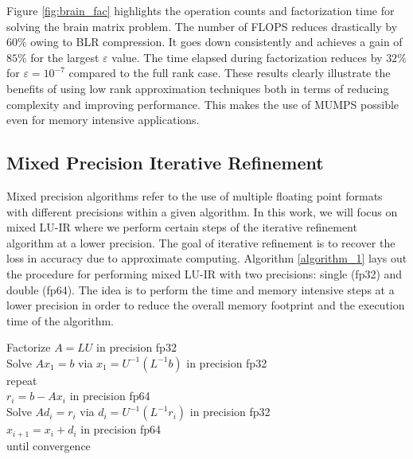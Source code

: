 \documentclass[a4paper,12pt]{article}
\begin{document}
Figure \ref{fig:brain_fac} highlights the operation counts and factorization time for solving the brain matrix problem. The number of FLOPS reduces drastically by $60\%$ owing to BLR compression. It goes down consistently and achieves a gain of $85\%$ for the largest $\varepsilon$ value. The time elapsed during factorization reduces by $32\%$ for $\varepsilon=10^{-7}$ compared to the full rank case. These results clearly illustrate the benefits of using low rank approximation techniques both in terms of reducing complexity and improving performance. This makes the use of MUMPS possible even for memory intensive applications.

\subsection{Mixed Precision Iterative Refinement}
Mixed precision algorithms refer to the use of multiple floating point formats with different precisions within a given algorithm. In this work, we will focus on mixed LU-IR where we perform certain steps of the iterative refinement algorithm at a lower precision. The goal of iterative refinement is to recover the loss in accuracy due to approximate computing. Algorithm \ref{algorithm_1} lays out the procedure for performing mixed LU-IR with two precisions: single (fp32) and double (fp64). The idea is to perform the time and memory intensive steps at a lower precision in order to reduce the overall memory footprint and the execution time of the algorithm.
\begin{algorithm}
    \caption{Mixed LU-IR}
    \label{algorithm_1}
    \begin{algorithmic}[1]
        \STATE Factorize $A=LU$ \hfill in precision fp32\\
        \STATE Solve $Ax_1=b$ via $x_1=U^{-1}(L^{-1}b)$ \hfill in precision fp32\\
        \STATE repeat \\
        \STATE \quad $r_i = b - Ax_i$ \hfill in precision fp64\\
        \STATE \quad Solve $Ad_i=r_i$ via $d_i=U^{-1}(L^{-1}r_i)$ \hfill in precision fp32\\
        \STATE \quad $x_{i+1} = x_i + d_i$ \hfill in precision fp64\\
        \STATE until convergence \\
    \end{algorithmic}
\end{algorithm}
\end{document}
